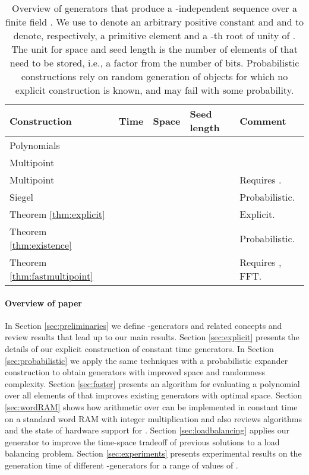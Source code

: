 \documentclass[a4paper,11pt]{article}
\theoremstyle{plain}
\theoremstyle{definition}
\begin{document}
\begin{table}[htpb]
  \centering
  \small
    \begin{tabular}{lllll}
    \toprule
	{\bf Construction}                        & {\bf Time}               & {\bf Space}                     & {\bf Seed length}    & {\bf Comment}  \\ \midrule
    Polynomials \cite{joffe1974,wegman1981}   &                    &                           &                   & \\
	Multipoint \cite{gathen2013}              &  &                    & 			      & \\
	Multipoint \cite{bostan2005}              &    &                           & 		          & Requires . \\ Siegel \cite{siegel2004}                  &                    &          &                & Probabilistic. \\
	Theorem \ref{thm:explicit}                &                    &                 &     & Explicit.  \\
	Theorem \ref{thm:existence}               &                    &   &                & Probabilistic. \\
	Theorem \ref{thm:fastmultipoint}          &               &                           & 
    & Requires , FFT. \\
   \bottomrule
    \end{tabular}
\caption{
Overview of generators that produce a -independent sequence over a finite field . 
We use  to denote an arbitrary positive constant and  and  to denote, respectively, a primitive element and a -th root of unity of .
The unit for space and seed length is the number of elements of  that need to be stored, i.e., a factor  from the number of bits. 
Probabilistic constructions rely on random generation of objects for which no explicit construction is known, and may fail with some probability.
}
\label{tab:results}
\end{table}

\paragraph{Overview of paper}
In Section \ref{sec:preliminaries} we define \mbox{-generators} and related concepts and review results that lead up to our main results.
Section \ref{sec:explicit} presents the details of our explicit construction of constant time generators. 
In Section \ref{sec:probabilistic} we apply the same techniques with a probabilistic expander construction to obtain generators with improved space and randomness complexity. 
Section \ref{sec:faster} presents an algorithm for evaluating a polynomial over all elements of  that improves existing generators with optimal space.
Section \ref{sec:wordRAM} shows how arithmetic over  can be implemented in constant time on a standard word RAM with integer multiplication and also reviews algorithms and the state of hardware support for .
Section \ref{sec:loadbalancing} applies our generator to improve the time-space tradeoff of previous solutions to a load balancing problem.
Section \ref{sec:experiments} presents experimental results on the generation time of different -generators for a range of values of . 
\end{document}
